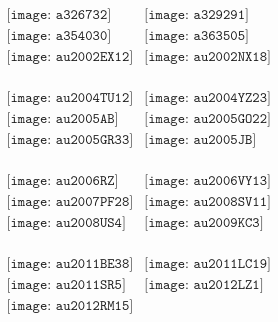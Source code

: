 \documentclass{article}
\begin{document}
\begin{figure}[H]
\begin{center}$
\begin{array}{cc}
\texttt{[image: a326732]}&\texttt{[image: a329291]}\\\texttt{[image: a354030]}&\texttt{[image: a363505]}\\\texttt{[image: au2002EX12]}&\texttt{[image: au2002NX18]}\\
\end{array}$
\end{center}
\end{figure}

\begin{figure}[H]
\begin{center}$
\begin{array}{cc}
\texttt{[image: au2004TU12]}&\texttt{[image: au2004YZ23]}\\\texttt{[image: au2005AB]}&\texttt{[image: au2005GO22]}\\\texttt{[image: au2005GR33]}&\texttt{[image: au2005JB]}\\
\end{array}$
\end{center}
\end{figure}

\begin{figure}[H]
\begin{center}$
\begin{array}{cc}
\texttt{[image: au2006RZ]}&\texttt{[image: au2006VY13]}\\\texttt{[image: au2007PF28]}&\texttt{[image: au2008SV11]}\\\texttt{[image: au2008US4]}&\texttt{[image: au2009KC3]}\\
\end{array}$
\end{center}
\end{figure}

        \clearpage
        
\begin{figure}[H]
\begin{center}$
\begin{array}{cc}
\texttt{[image: au2011BE38]}&\texttt{[image: au2011LC19]}\\\texttt{[image: au2011SR5]}&\texttt{[image: au2012LZ1]}\\\texttt{[image: au2012RM15]}&
\end{array}$
\end{center}
\end{figure}
\end{document}
